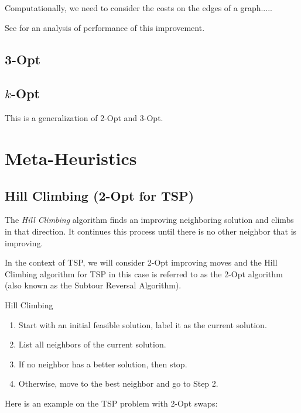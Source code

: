 Computationally, we need to consider the costs on the edges of a graph.....


See 
\cite{Englert2014} for an analysis of performance of this improvement.
\subsection{3-Opt}


\subsection{$k$-Opt}
This is a generalization of 2-Opt and 3-Opt.

\section{Meta-Heuristics}

\subsection{Hill Climbing (2-Opt for TSP)}
The \emph{Hill Climbing} algorithm finds an improving neighboring solution and climbs in that direction.  It continues this process until there is no other neighbor that is improving.  

In the context of TSP, we will consider 2-Opt improving moves and the Hill Climbing algorithm for TSP in this case is referred to as the 2-Opt algorithm (also known as the Subtour Reversal Algorithm).
\begin{general}{Hill Climbing}{}
\begin{enumerate}
\item Start with an initial feasible solution, label it as the current solution.
\item List all neighbors of the current solution.
\item If no neighbor has a better solution, then stop.
\item Otherwise, move to the best neighbor and go to Step 2.
\end{enumerate}
\end{general}


Here is an example on the TSP problem with 2-Opt swaps:


